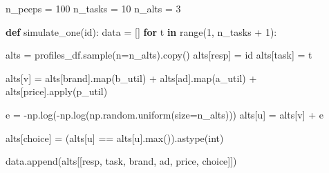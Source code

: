 \documentclass[
  letterpaper,
  DIV=11,
  numbers=noendperiod]{scrartcl}
\newenvironment{Shaded}{\begin{snugshade}}{\end{snugshade}}
\newcommand{\BuiltInTok}[1]{\textcolor[rgb]{0.00,0.23,0.31}{#1}}
\newcommand{\ControlFlowTok}[1]{\textcolor[rgb]{0.00,0.23,0.31}{\textbf{#1}}}
\newcommand{\DecValTok}[1]{\textcolor[rgb]{0.68,0.00,0.00}{#1}}
\newcommand{\KeywordTok}[1]{\textcolor[rgb]{0.00,0.23,0.31}{\textbf{#1}}}
\newcommand{\NormalTok}[1]{\textcolor[rgb]{0.00,0.23,0.31}{#1}}
\newcommand{\OperatorTok}[1]{\textcolor[rgb]{0.37,0.37,0.37}{#1}}
\newcommand{\StringTok}[1]{\textcolor[rgb]{0.13,0.47,0.30}{#1}}
\begin{document}
\begin{tcolorbox}
\begin{Shaded}
\begin{Highlighting}[]
\NormalTok{n\_peeps }\OperatorTok{=} \DecValTok{100}
\NormalTok{n\_tasks }\OperatorTok{=} \DecValTok{10}
\NormalTok{n\_alts }\OperatorTok{=} \DecValTok{3}


\KeywordTok{def}\NormalTok{ simulate\_one(}\BuiltInTok{id}\NormalTok{):}
\NormalTok{    data }\OperatorTok{=}\NormalTok{ []}
    \ControlFlowTok{for}\NormalTok{ t }\KeywordTok{in} \BuiltInTok{range}\NormalTok{(}\DecValTok{1}\NormalTok{, n\_tasks }\OperatorTok{+} \DecValTok{1}\NormalTok{):}

\NormalTok{        alts }\OperatorTok{=}\NormalTok{ profiles\_df.sample(n}\OperatorTok{=}\NormalTok{n\_alts).copy()}
\NormalTok{        alts[}\StringTok{\textquotesingle{}resp\textquotesingle{}}\NormalTok{] }\OperatorTok{=} \BuiltInTok{id}
\NormalTok{        alts[}\StringTok{\textquotesingle{}task\textquotesingle{}}\NormalTok{] }\OperatorTok{=}\NormalTok{ t}


\NormalTok{        alts[}\StringTok{\textquotesingle{}v\textquotesingle{}}\NormalTok{] }\OperatorTok{=}\NormalTok{ alts[}\StringTok{\textquotesingle{}brand\textquotesingle{}}\NormalTok{].}\BuiltInTok{map}\NormalTok{(b\_util) }\OperatorTok{+}\NormalTok{ alts[}\StringTok{\textquotesingle{}ad\textquotesingle{}}\NormalTok{].}\BuiltInTok{map}\NormalTok{(a\_util) }\OperatorTok{+}\NormalTok{ alts[}\StringTok{\textquotesingle{}price\textquotesingle{}}\NormalTok{].}\BuiltInTok{apply}\NormalTok{(p\_util)}


\NormalTok{        e }\OperatorTok{=} \OperatorTok{{-}}\NormalTok{np.log(}\OperatorTok{{-}}\NormalTok{np.log(np.random.uniform(size}\OperatorTok{=}\NormalTok{n\_alts)))}
\NormalTok{        alts[}\StringTok{\textquotesingle{}u\textquotesingle{}}\NormalTok{] }\OperatorTok{=}\NormalTok{ alts[}\StringTok{\textquotesingle{}v\textquotesingle{}}\NormalTok{] }\OperatorTok{+}\NormalTok{ e}


\NormalTok{        alts[}\StringTok{\textquotesingle{}choice\textquotesingle{}}\NormalTok{] }\OperatorTok{=}\NormalTok{ (alts[}\StringTok{\textquotesingle{}u\textquotesingle{}}\NormalTok{] }\OperatorTok{==}\NormalTok{ alts[}\StringTok{\textquotesingle{}u\textquotesingle{}}\NormalTok{].}\BuiltInTok{max}\NormalTok{()).astype(}\BuiltInTok{int}\NormalTok{)}

\NormalTok{        data.append(alts[[}\StringTok{\textquotesingle{}resp\textquotesingle{}}\NormalTok{, }\StringTok{\textquotesingle{}task\textquotesingle{}}\NormalTok{, }\StringTok{\textquotesingle{}brand\textquotesingle{}}\NormalTok{, }\StringTok{\textquotesingle{}ad\textquotesingle{}}\NormalTok{, }\StringTok{\textquotesingle{}price\textquotesingle{}}\NormalTok{, }\StringTok{\textquotesingle{}choice\textquotesingle{}}\NormalTok{]])}
    

\end{Highlighting}
\end{Shaded}
\end{tcolorbox}
\end{document}
